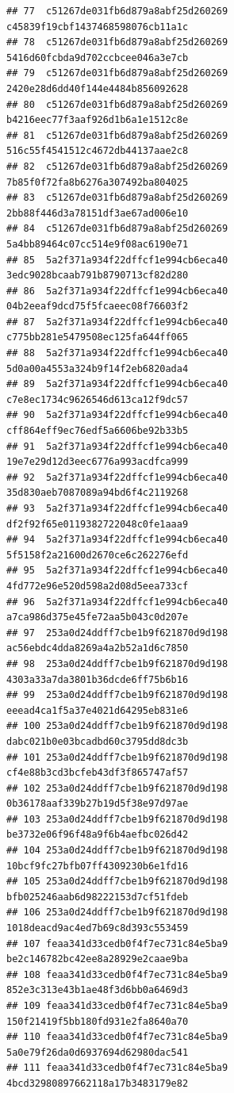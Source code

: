 \documentclass[]{article}
\begin{document}
\begin{verbatim}
## 77  c51267de031fb6d879a8abf25d260269   c45839f19cbf1437468598076cb11a1c
## 78  c51267de031fb6d879a8abf25d260269   5416d60fcbda9d702ccbcee046a3e7cb
## 79  c51267de031fb6d879a8abf25d260269   2420e28d6dd40f144e4484b856092628
## 80  c51267de031fb6d879a8abf25d260269   b4216eec77f3aaf926d1b6a1e1512c8e
## 81  c51267de031fb6d879a8abf25d260269   516c55f4541512c4672db44137aae2c8
## 82  c51267de031fb6d879a8abf25d260269   7b85f0f72fa8b6276a307492ba804025
## 83  c51267de031fb6d879a8abf25d260269   2bb88f446d3a78151df3ae67ad006e10
## 84  c51267de031fb6d879a8abf25d260269   5a4bb89464c07cc514e9f08ac6190e71
## 85  5a2f371a934f22dffcf1e994cb6eca40   3edc9028bcaab791b8790713cf82d280
## 86  5a2f371a934f22dffcf1e994cb6eca40   04b2eeaf9dcd75f5fcaeec08f76603f2
## 87  5a2f371a934f22dffcf1e994cb6eca40   c775bb281e5479508ec125fa644ff065
## 88  5a2f371a934f22dffcf1e994cb6eca40   5d0a00a4553a324b9f14f2eb6820ada4
## 89  5a2f371a934f22dffcf1e994cb6eca40   c7e8ec1734c9626546d613ca12f9dc57
## 90  5a2f371a934f22dffcf1e994cb6eca40   cff864eff9ec76edf5a6606be92b33b5
## 91  5a2f371a934f22dffcf1e994cb6eca40   19e7e29d12d3eec6776a993acdfca999
## 92  5a2f371a934f22dffcf1e994cb6eca40   35d830aeb7087089a94bd6f4c2119268
## 93  5a2f371a934f22dffcf1e994cb6eca40   df2f92f65e0119382722048c0fe1aaa9
## 94  5a2f371a934f22dffcf1e994cb6eca40   5f5158f2a21600d2670ce6c262276efd
## 95  5a2f371a934f22dffcf1e994cb6eca40   4fd772e96e520d598a2d08d5eea733cf
## 96  5a2f371a934f22dffcf1e994cb6eca40   a7ca986d375e45fe72aa5b043c0d207e
## 97  253a0d24ddff7cbe1b9f621870d9d198   ac56ebdc4dda8269a4a2b52a1d6c7850
## 98  253a0d24ddff7cbe1b9f621870d9d198   4303a33a7da3801b36dcde6ff75b6b16
## 99  253a0d24ddff7cbe1b9f621870d9d198   eeead4ca1f5a37e4021d64295eb831e6
## 100 253a0d24ddff7cbe1b9f621870d9d198   dabc021b0e03bcadbd60c3795dd8dc3b
## 101 253a0d24ddff7cbe1b9f621870d9d198   cf4e88b3cd3bcfeb43df3f865747af57
## 102 253a0d24ddff7cbe1b9f621870d9d198   0b36178aaf339b27b19d5f38e97d97ae
## 103 253a0d24ddff7cbe1b9f621870d9d198   be3732e06f96f48a9f6b4aefbc026d42
## 104 253a0d24ddff7cbe1b9f621870d9d198   10bcf9fc27bfb07ff4309230b6e1fd16
## 105 253a0d24ddff7cbe1b9f621870d9d198   bfb025246aab6d98222153d7cf51fdeb
## 106 253a0d24ddff7cbe1b9f621870d9d198   1018deacd9ac4ed7b69c8d393c553459
## 107 feaa341d33cedb0f4f7ec731c84e5ba9   be2c146782bc42ee8a28929e2caae9ba
## 108 feaa341d33cedb0f4f7ec731c84e5ba9   852e3c313e43b1ae48f3d6bb0a6469d3
## 109 feaa341d33cedb0f4f7ec731c84e5ba9   150f21419f5bb180fd931e2fa8640a70
## 110 feaa341d33cedb0f4f7ec731c84e5ba9   5a0e79f26da0d6937694d62980dac541
## 111 feaa341d33cedb0f4f7ec731c84e5ba9   4bcd32980897662118a17b3483179e82

\end{verbatim}
\end{document}

